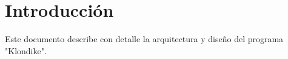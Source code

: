 \newpage
\section{Introducción}
Este documento describe con detalle la arquitectura y diseño del programa "Klondike".


\setcounter{tocdepth}{1}
\setcounter{secttocdepth}{5}
\tableofcontents